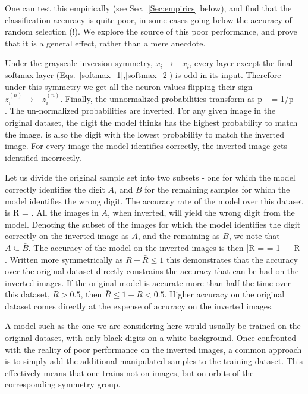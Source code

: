 \documentclass{svproc}
\begin{document}
One can test this empirically (see Sec.~\ref{Sec:empirics} below), and find that the classification accuracy is quite poor, in some cases going below the accuracy of random selection (!). We explore the source of this poor performance, and prove that it is a general effect, rather than a mere anecdote.

Under the grayscale inversion symmetry, $x_i \rightarrow - x_i$, every layer except the final softmax layer (Eqs.~\ref{softmax_1},\ref{softmax_2}) is odd in its 
input. Therefore under this symmetry we get all the neuron values flipping their sign $z^{(n)}_i \rightarrow - z^{(n)}_i$. Finally, the unnormalized probabilities transform as
\be
{\tilde p}_{\alpha} \rightarrow \exp{} = 1/{\tilde p}_{\alpha}
\; .
\ee
The un-normalized probabilities are inverted. For any given image in the original dataset, the digit the model thinks has the highest probability to match the image, is also the digit with the lowest probability to match the inverted image. For every image the model identifies correctly, the inverted image gets identified incorrectly.

Let us divide the original sample set into two subsets - one for which the model correctly identifies the digit $A$, and $B$ for the remaining samples for which the model identifies the wrong digit. The accuracy rate of the model over this dataset is 
\be
R = 
\; .
\ee
All the images in $A$, when inverted, will yield the wrong digit from the model. Denoting the subset of the images for which the model identifies the digit correctly on the inverted image as ${\bar A}$, and the remaining as ${\bar B}$, we note that $A \subseteq {\bar B}$. The accuracy of the model on the inverted images is then
\be
{\bar R} =  = 1 -   - R
\; .
\ee
Written more symmetrically as $R + {\bar R} \leq 1$ this demonstrates that the accuracy over the original dataset directly constrains the accuracy that can be had on the inverted images. If the original model is accurate more than half the time over this dataset, $R>0.5$, then ${\bar R} \leq 1 - R < 0.5$. Higher accuracy on the original dataset comes directly at the expense of accuracy on the inverted images.

A model such as the one we are considering here would usually be trained on the original dataset, with only black digits on a white background. Once confronted with the reality of poor performance on the inverted images, a common approach is to simply add the additional manipulated samples to the training dataset. This effectively means that one trains not on images, but on orbits of the corresponding symmetry group.
\end{document}
